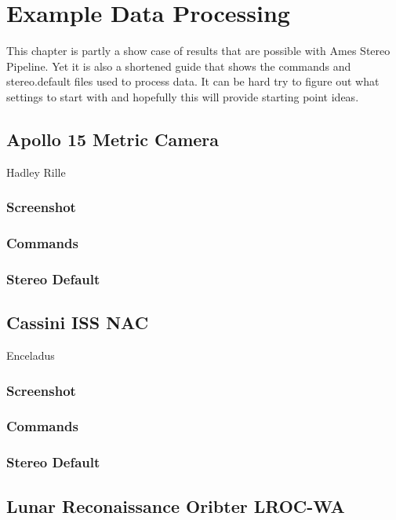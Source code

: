 \chapter{Example Data Processing}

This chapter is partly a show case of results that are possible with
Ames Stereo Pipeline. Yet it is also a shortened guide that shows the
commands and stereo.default files used to process data. It can be hard
try to figure out what settings to start with and hopefully this will
provide starting point ideas.

\section{Apollo 15 Metric Camera}

Hadley Rille

\subsection{Screenshot}

\subsection{Commands}

\subsection{Stereo Default}

\section{Cassini ISS NAC}

Enceladus

\subsection{Screenshot}

\subsection{Commands}

\subsection{Stereo Default}

\section{Lunar Reconaissance Oribter LROC-WA}

